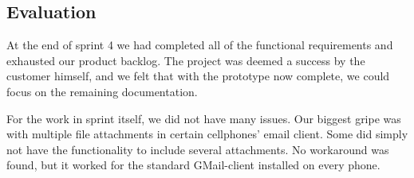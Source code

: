 \subsection{Evaluation}
At the end of sprint 4 we had completed all of the functional requirements and
exhausted our product backlog. The project was deemed a success by the customer
himself, and we felt that with the prototype now complete, we could focus on the
remaining documentation.

For the work in sprint itself, we did not have many issues. Our biggest gripe
was with multiple file attachments in certain cellphones' email client. Some did
simply not have the functionality to include several attachments. No workaround
was found, but it worked for the standard GMail-client installed on every phone. 
